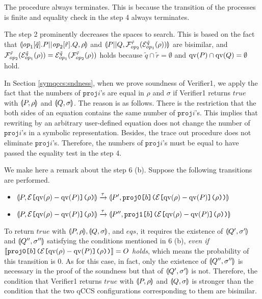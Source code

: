 The procedure always terminates.
This is because the transition of the processes is finite and
equality check in the step 4 always terminates.

The step 2 prominently decreases the spaces to search.
This is based on the fact that 
$\llparenthesis \mathit{op}_1[\tilde q].P||\mathit{op}_2[\tilde
r].Q, \rho \rrparenthesis$ and $ 
\llparenthesis P||Q, \mathcal{F}_{op_2}^{\tilde r}(\mathcal{E}_{op_1}^{\tilde q}(\rho)) \rrparenthesis$ are
bisimilar, and \\
 $\mathcal{F}_{op_2}^{\tilde r}(\mathcal{E}_{op_1}^{\tilde q}(\rho)) =
\mathcal{E}_{op_1}^{\tilde q}(\mathcal{F}_{op_2}^{\tilde r}(\rho)) $ holds because $\tilde
q \cap \tilde r = \emptyset$ and $\mathrm{qv}(P)\cap\mathrm{qv}(Q)=\emptyset$ hold.

In Section \ref{symqccs:sndness}, when we prove soundness of
Verifier1, we apply the fact that the numbers of $\mathtt{proj}i$'s
are equal in $\rho$ and $\sigma$ if Verifier1 returns $\mathit{true}$
with $\llparenthesis P, \rho \rrparenthesis$ and $\llparenthesis Q, \sigma \rrparenthesis$. The reason is as follows.
There is the restriction that the both sides of an equation contains
the same number of $\mathtt{proj}i$'s.
This implies that rewriting by an arbitrary user-defined equation
does not change the number of $\mathtt{proj}i$'s in a symbolic
representation. Besides, the trace out procedure does not
eliminate $\mathtt{proj}i$'s. Therefore, the numbers of 
$\mathtt{proj}i$'s must be equal to have passed the equality test
in the step 4. 

We make here a remark about the step 6 (b).
Suppose the following transitions are performed.
\begin{itemize}
 \item $ \llparenthesis P, \mathcal{E}\texttt{[}\mathrm{qv}(\rho) -
		    \mathrm{qv}(P)\texttt{](}\rho\texttt{)} \rrparenthesis
       \xrightarrow{\tau}
       \llparenthesis P', \mathtt{proj0}\texttt{[}b\texttt{]}\texttt{(}\mathcal{E}\texttt{[}\mathrm{qv}(\rho) -
       \mathrm{qv}(P)\texttt{](}\rho\texttt{)}\texttt{)} \rrparenthesis$
 \item $ \llparenthesis P, \mathcal{E}\texttt{[}\mathrm{qv}(\rho) -
		    \mathrm{qv}(P)\texttt{](}\rho\texttt{)} \rrparenthesis
       \xrightarrow{\tau}
       \llparenthesis P'', \mathtt{proj1}\texttt{[}b\texttt{]}\texttt{(}\mathcal{E}\texttt{[}\mathrm{qv}(\rho) -
       \mathrm{qv}(P)\texttt{](}\rho\texttt{)}\texttt{)} \rrparenthesis$
\end{itemize}
To return $\mathit{true}$ with $\llparenthesis P, \rho \rrparenthesis,
\llparenthesis Q, \sigma \rrparenthesis$, and $\mathit{eqs}$, 
it requires the existence of $\llparenthesis Q', \sigma' \rrparenthesis$ and
$\llparenthesis Q'', \sigma'' \rrparenthesis$ satisfying the conditions mentioned in 6
(b), \emph{even if} $[\![\mathtt{proj0}\texttt{[}b\texttt{]}\texttt{(}\mathcal{E}\texttt{[}\mathrm{qv}(\rho) -
       \mathrm{qv}(P)\texttt{](}\rho\texttt{)}\texttt{)}]\!] = O$ \emph{holds}, which
means the probability of this transition is $0$.
As for this case, in fact, only the 
existence of $\llparenthesis Q'', \sigma'' \rrparenthesis$ is necessary 
in the proof of the soundness but that of
$\llparenthesis Q', \sigma' \rrparenthesis$ is not. Therefore, the condition
that Verifier1 returns $\mathit{true}$ with $\llparenthesis P, \rho \rrparenthesis$ and
$\llparenthesis Q, \sigma \rrparenthesis$ is stronger than the condition that
the two qCCS configurations corresponding to them are bisimilar.

